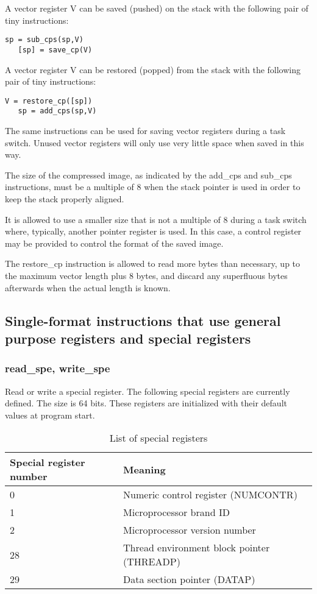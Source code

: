 \documentclass[forwardcom.tex]{subfiles}
\begin{document}
A vector register V can be saved (pushed) on the stack with the following pair of tiny instructions:

\begin{lstlisting}[frame=none]
   sp = sub_cps(sp,V)
   [sp] = save_cp(V)
\end{lstlisting}

A vector register V can be restored (popped) from the stack with the following pair of tiny instructions:

\begin{lstlisting}[frame=none]
   V = restore_cp([sp])
   sp = add_cps(sp,V)
\end{lstlisting}

The same instructions can be used for saving vector registers during a task switch. Unused vector registers will only use very little space when saved in this way.
\vspace{2mm}

The size of the compressed image, as indicated by the add\_cps and sub\_cps instructions, must be a multiple of 8 when the stack pointer is used in order to keep the stack properly aligned. 
\vspace{2mm}

It is allowed to use a smaller size that is not a multiple of 8 during a task switch where, typically, another pointer register is used. In this case, a control register may be provided to control the format of the saved image.
\vspace{2mm}

The restore\_cp instruction is allowed to read more bytes than necessary, up to the maximum vector length plus 8 bytes, and discard any superfluous bytes afterwards when the actual length is known.

\subsection{Single-format instructions that use general purpose registers and special registers}

\subsubsection{read\_spe, write\_spe}
Read or write a special register. The following special registers are currently defined. The size is 64 bits. These registers are initialized with their default values at program start.

\begin{longtable} {|p{15mm}|p{100mm}|}
\caption{List of special registers} 
\label{table:specialRegisters} \\
\endfirsthead
\endhead
\hline
\bfseries Special register number & \bfseries Meaning  \\
\hline
0 & Numeric control register (NUMCONTR)  \\
1 & Microprocessor brand ID  \\
2 & Microprocessor version number   \\
28 & Thread environment block pointer (THREADP)   \\
29 & Data section pointer (DATAP)  \\
\hline
\end{longtable}
\end{document}
